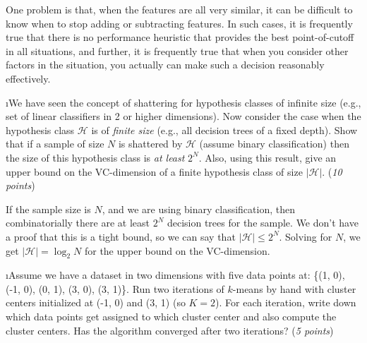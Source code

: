 \documentclass[fleqn]{article}
\begin{document}
\begin{solution}
One problem is that, when the features are all very similar, it can be difficult to know when to stop adding or subtracting features. In such cases, it is frequently true that there is no performance heuristic that provides the best point-of-cutoff in all situations, and further, it is frequently true that when you consider other factors in the situation, you actually can make such a decision reasonably effectively.
\end{solution}

\i We have seen the concept of shattering for hypothesis classes of
infinite size (e.g., set of linear classifiers in 2 or higher dimensions).
Now consider the case when the hypothesis class $\mathcal{H}$ is of \textit{finite 
size} (e.g., all decision trees of a fixed depth). Show that if a sample of
size $N$ is shattered by $\mathcal{H}$ (assume binary classification) then 
the size of this hypothesis class is \textit{at least} $2^N$. Also, using
this result, give an upper bound on the VC-dimension of a finite hypothesis
class of size $|\mathcal{H}|$. (\textit{10 points})  

\begin{solution}
If the sample size is $N$, and we are using binary classification, then combinatorially there are at least $2^N$ decision trees for the sample. We don't have a proof that this is a tight bound, so we can say that $|\mathcal{H}| \le 2^N$. Solving for $N$, we get $|\mathcal{H}| = \log_2 N$ for the upper bound on the VC-dimension.
\end{solution}

\i Assume we have a dataset in two dimensions with five data points at: 
\{(1, 0), (-1, 0), (0, 1), (3, 0), (3, 1)\}. Run two iterations of 
$k$-means by hand with cluster centers initialized at (-1, 0) and 
(3, 1) (so $K=2$). For each iteration, write down which data points get
assigned to which cluster center and also compute the cluster centers.
Has the algorithm converged after two iterations? (\textit{5 points})
\end{document}

